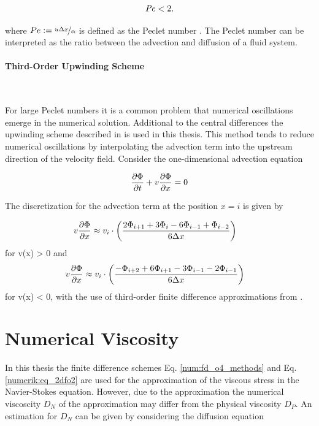 \begin{align}
    \Pe  < 2.
\end{align}

where $ Pe := \nicefrac{u \Delta x}{\alpha}$ is defined as the Peclet number \citep{ferziger99}.
The Peclet number can be interpreted as the ratio between the advection and diffusion of a fluid system.

\paragraph{Third-Order Upwinding Scheme}\mbox{}\\
\label{num:sec_para:upwindingscheme}

For large Peclet numbers it is a common problem that numerical oscillations emerge in the numerical solution.
Additional to the central differences the upwinding scheme described in \citep{ferziger99} is used in this thesis.
This method tends to reduce numerical oscillations by interpolating
the advection term into the upstream direction of the velocity field.
Consider the one-dimensional advection equation

\begin{align}
    \pdn[\Phi]{t} + v\pdn[\Phi]{x} = 0
\end{align}

The discretization for the advection term at the position $x=i$ is given by

\begin{align}
    v\pdn[\Phi]{x} &\approx  v_i \cdot \left(\frac{2\Phi_{i+1} + 3\Phi_i     - 6\Phi_{i-1} + \Phi_{i-2}}{6\Delta x}\right)
\end{align}
for v(x) > 0 and
\begin{align}
    v\pdn[\Phi]{x} &\approx  v_i \cdot \left( \frac{-\Phi_{i+2} + 6\Phi_{i+1} - 3\Phi_{i-1} - 2\Phi_{i-1}}{6\Delta x}\right)
\end{align}
for v(x) < 0,
with the use of third-order finite difference approximations from \citep{ferziger99}.

\newpage

\section{Numerical Viscosity}

In this thesis the finite difference schemes Eq. \ref{num:fd_o4_methods} and Eq. \ref{numerik:eq_2dfo2}
are used for the approximation of the viscous stress in the Navier-Stokes equation.
However, due to the approximation the numerical viscoscity $D_N$ of the approximation may differ from the physical viscosity $D_P$.
An estimation for $D_N$ can be given by considering the diffusion equation

